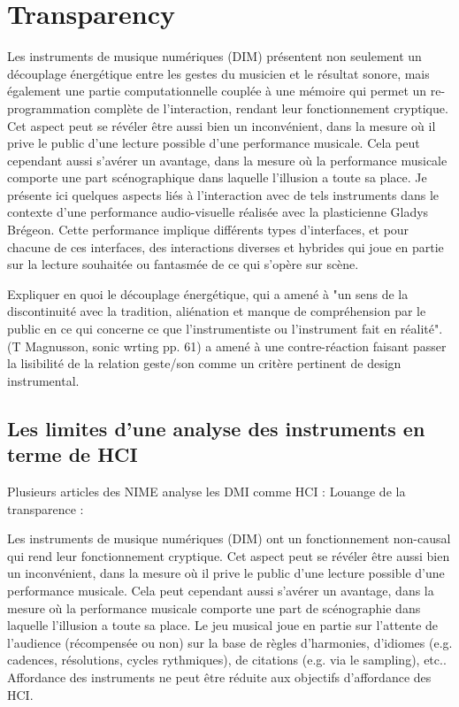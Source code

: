 %
\chapter{Transparency}
\label{ch:transparency}


Les instruments de musique numériques (DIM) présentent non seulement un découplage énergétique entre les gestes du musicien et le résultat sonore, mais également une partie computationnelle couplée à une mémoire qui permet un re-programmation complète de l'interaction, rendant leur fonctionnement cryptique. Cet aspect peut se révéler être aussi bien un inconvénient, dans la mesure où il prive le public d’une lecture possible d’une performance musicale. Cela peut cependant aussi s’avérer un avantage, dans la mesure où la performance musicale comporte une part scénographique dans laquelle l’illusion a toute sa place.
Je présente ici quelques aspects liés à l’interaction avec de tels instruments dans le contexte d’une performance audio-visuelle réalisée avec la plasticienne Gladys Brégeon. Cette performance implique différents types d’interfaces, et pour chacune de ces interfaces, des interactions diverses et hybrides qui joue en partie sur la lecture souhaitée ou fantasmée de ce qui s’opère sur scène.

Expliquer en quoi le découplage énergétique, qui a amené à "un sens de la discontinuité avec la tradition, aliénation et manque de compréhension par le public en ce qui concerne ce que l'instrumentiste ou l'instrument fait en réalité". (T Magnusson, sonic wrting pp. 61) a amené à une contre-réaction faisant passer la lisibilité de la relation geste/son comme un critère pertinent de design instrumental.

\section{Les limites d'une analyse des instruments en terme de HCI}
\label{sec:transparency:limitesHCI}

Plusieurs articles des NIME analyse les DMI comme HCI : 
Louange de la transparence : \cite{Fels02}

Les instruments de musique numériques (DIM) ont un fonctionnement non-causal qui rend leur fonctionnement cryptique. Cet aspect peut se révéler être aussi bien un inconvénient, dans la mesure où il prive le public d’une lecture possible d’une performance musicale. Cela peut cependant aussi s’avérer un avantage, dans la mesure où la performance musicale comporte une part de scénographie dans laquelle l’illusion a toute sa place.
Le jeu musical joue en partie sur l’attente de l’audience (récompensée ou non) sur la base de règles d'harmonies, d’idiomes (e.g. cadences, résolutions, cycles rythmiques), de citations (e.g. via le sampling), etc..
Affordance des instruments ne peut être réduite aux objectifs d’affordance des HCI.


